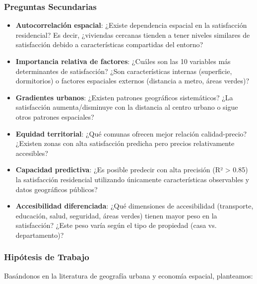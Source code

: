 \subsubsection{Preguntas Secundarias}

\begin{itemize}
    \item \textbf{Autocorrelación espacial}: ¿Existe dependencia espacial en la satisfacción residencial? Es decir, ¿viviendas cercanas tienden a tener niveles similares de satisfacción debido a características compartidas del entorno?
    
    \item \textbf{Importancia relativa de factores}: ¿Cuáles son las 10 variables más determinantes de satisfacción? ¿Son características internas (superficie, dormitorios) o factores espaciales externos (distancia a metro, áreas verdes)?
    
    \item \textbf{Gradientes urbanos}: ¿Existen patrones geográficos sistemáticos? ¿La satisfacción aumenta/disminuye con la distancia al centro urbano o sigue otros patrones espaciales?
    
    \item \textbf{Equidad territorial}: ¿Qué comunas ofrecen mejor relación calidad-precio? ¿Existen zonas con alta satisfacción predicha pero precios relativamente accesibles?
    
    \item \textbf{Capacidad predictiva}: ¿Es posible predecir con alta precisión (R² > 0.85) la satisfacción residencial utilizando únicamente características observables y datos geográficos públicos?
    
    \item \textbf{Accesibilidad diferenciada}: ¿Qué dimensiones de accesibilidad (transporte, educación, salud, seguridad, áreas verdes) tienen mayor peso en la satisfacción? ¿Este peso varía según el tipo de propiedad (casa vs. departamento)?
\end{itemize}

\subsubsection{Hipótesis de Trabajo}

Basándonos en la literatura de geografía urbana y economía espacial, planteamos:


